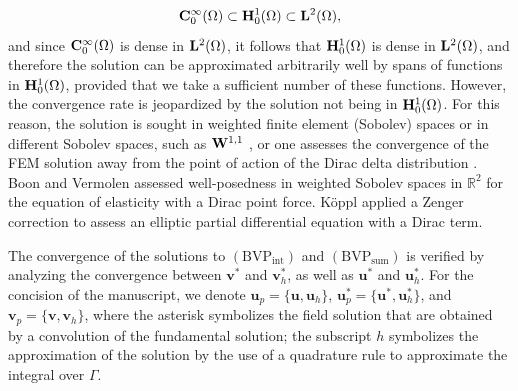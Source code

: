 \documentclass[pdflatex,sn-mathphys-num]{sn-jnl}
\newtheorem*{lemma star}{Lemma}
\begin{document}
$${\bf C}^{\infty}_0(\Omega) \subset {\bf H}^1_0(\Omega) \subset {\bf L}^2(\Omega),$$
and since ${\bf C}^{\infty}_0(\Omega)$ is dense in ${\bf L}^2(\Omega)$, it follows that ${\bf H}^1_0(\Omega)$ is dense in ${\bf L}^2(\Omega)$, and therefore the solution can be approximated arbitrarily well by spans of functions in ${\bf H}^1_0(\Omega)$, provided that we take a sufficient number of these functions. However, the convergence rate is jeopardized by the solution not being in ${\bf H}^1_0(\Omega)$. For this reason, the solution is sought
in weighted finite element (Sobolev) spaces \citep{Boon_2023} or in different Sobolev spaces, such as ${\bf W}^{1,1}$ \citep{D_Angelo_2012}, or one assesses the convergence of
the FEM solution away from the point of action of the Dirac delta
distribution \citep{K_ppl_2014}. Boon and Vermolen \cite{Boon_2023} assessed well-posedness in weighted Sobolev spaces in $\mathbb{R}^{2}$ for the equation of elasticity with a Dirac point force. K\"oppl \citep{K_ppl_2024} applied a Zenger correction to assess an elliptic partial differential equation with a Dirac term. 

The convergence of the solutions to $\mathrm{(BVP_{int})}$ and $\mathrm{(BVP_{sum})}$ is verified by analyzing the convergence between $\boldsymbol{v}^*$ and $\boldsymbol{v}_h^*$, as well as $\boldsymbol{u}^*$ and $\boldsymbol{u}_h^*$. For the concision of the manuscript, we denote $\boldsymbol{u}_p = \{\boldsymbol{u},\boldsymbol{u}_h\}$, $\boldsymbol{u}^*_p = \{\boldsymbol{u}^*,\boldsymbol{u}^*_h\}$, and $\boldsymbol{v}_p = \{\boldsymbol{v},\boldsymbol{v}_h\}$, where the asterisk symbolizes the field solution that are obtained by a convolution of the fundamental solution; the subscript $h$ symbolizes the approximation of the solution by the use of a quadrature rule to approximate the integral over $\Gamma$.
\end{document}
